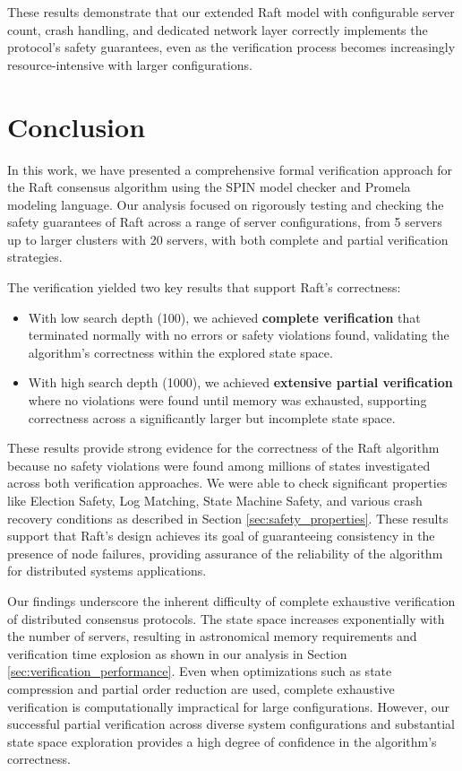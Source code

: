 These results demonstrate that our extended Raft model with configurable server count, crash handling, and dedicated network layer correctly implements the protocol's safety guarantees, even as the verification process becomes increasingly resource-intensive with larger configurations.

    
    \chapter{Conclusion}
    \label{sec:conclusion}

    In this work, we have presented a comprehensive formal verification approach for the Raft consensus algorithm using the SPIN model checker and Promela modeling language. Our analysis focused on rigorously testing and checking the safety guarantees of Raft across a range of server configurations, from 5 servers up to larger clusters with 20 servers, with both complete and partial verification strategies.
    
    The verification yielded two key results that support Raft's correctness:
    \begin{itemize}
        \item With low search depth (100), we achieved \textbf{complete verification} that terminated normally with no errors or safety violations found, validating the algorithm's correctness within the explored state space.
        \item With high search depth (1000), we achieved \textbf{extensive partial verification} where no violations were found until memory was exhausted, supporting correctness across a significantly larger but incomplete state space.
    \end{itemize}
    
    These results provide strong evidence for the correctness of the Raft algorithm because no safety violations were found among millions of states investigated across both verification approaches. We were able to check significant properties like Election Safety, Log Matching, State Machine Safety, and various crash recovery conditions as described in Section \ref{sec:safety_properties}. These results support that Raft's design achieves its goal of guaranteeing consistency in the presence of node failures, providing assurance of the reliability of the algorithm for distributed systems applications.

Our findings underscore the inherent difficulty of complete exhaustive verification of distributed consensus protocols. The state space increases exponentially with the number of servers, resulting in astronomical memory requirements and verification time explosion as shown in our analysis in Section \ref{sec:verification_performance}. Even when optimizations such as state compression and partial order reduction are used, complete exhaustive verification is computationally impractical for large configurations. However, our successful partial verification across diverse system configurations and substantial state space exploration provides a high degree of confidence in the algorithm's correctness.
    
